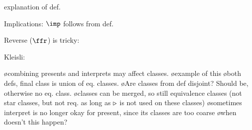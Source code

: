 explanation of def.


Implications: $\imp$ follows from def.


Reverse ($\ffr$) is tricky:

Kleisli:




\bl
\o combining presents and interprets may affect classes. 
\o example of this
\o both defs, final class is union of eq. classes. 
\o Are classes from def disjoint? Should be, otherwise no eq. class. 
\o classes can be merged, so still equivalence classes (not star classes, but not req. as long as $\triangleright$ is not used on these classes)
\o sometimes interpret is no longer okay for present, since its classes are too coarse
\o when doesn't this happen?
\el

